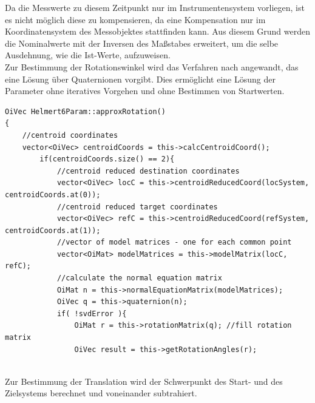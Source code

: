Da die Messwerte zu diesem Zeitpunkt nur im Instrumentensystem vorliegen, ist es nicht möglich diese zu kompensieren, da eine Kompensation nur im Koordinatensystem des Messobjektes stattfinden kann. Aus diesem Grund werden die Nominalwerte mit der Inversen des Maßstabes erweitert, um die selbe Ausdehnung, wie die Ist-Werte, aufzuweisen.\\

Zur Bestimmung der Rotationswinkel wird das Verfahren nach \cite{Drixler1993} angewandt, das eine Lösung über Quaternionen vorgibt. Dies ermöglicht eine Lösung der Parameter ohne iteratives Vorgehen und ohne Bestimmen von Startwerten.
\begin{lstlisting}[caption={Berechnung der Rotationswinkel},captionpos=t]
OiVec Helmert6Param::approxRotation()
{
	//centroid coordinates
    vector<OiVec> centroidCoords = this->calcCentroidCoord(); 
        if(centroidCoords.size() == 2){
			//centroid reduced destination coordinates            
            vector<OiVec> locC = this->centroidReducedCoord(locSystem, centroidCoords.at(0)); 
			//centroid reduced target coordinates            
            vector<OiVec> refC = this->centroidReducedCoord(refSystem, centroidCoords.at(1)); 
 			//vector of model matrices - one for each common point
            vector<OiMat> modelMatrices = this->modelMatrix(locC, refC); 
			//calculate the normal equation matrix            
            OiMat n = this->normalEquationMatrix(modelMatrices); 
            OiVec q = this->quaternion(n);
            if( !svdError ){
                OiMat r = this->rotationMatrix(q); //fill rotation matrix
                OiVec result = this->getRotationAngles(r);
                
\end{lstlisting}

Zur Bestimmung der Translation wird der Schwerpunkt des Start- und des Zielsystems berechnet und voneinander subtrahiert.\\


